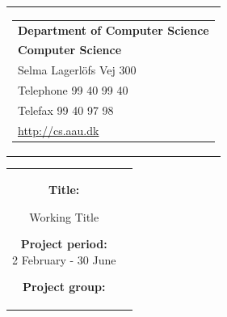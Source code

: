 \thispagestyle{empty}
\begin{titlepage}
\begin{nopagebreak}
{\samepage 
\begin{tabular}{r}
\parbox{\textwidth}{  
\hfill \parbox{5.9cm}{\begin{tabular}{l}
{\sf\small \textbf{Department of Computer Science}}\\
{\sf\small  \textbf{Computer Science}} \\
{\sf\small Selma Lagerl\"{o}fs Vej 300} \\
{\sf\small Telephone 99 40 99 40} \\
{\sf\small Telefax 99 40 97 98} \\
{\sf\small \url{http://cs.aau.dk}}
\end{tabular}}}
\\
\end{tabular}

\begin{tabular}{cc}
\parbox{7cm}{
\begin{description}

\item {\bf Title:} 

Working Title

\end{description}

\parbox{8cm}{

\begin{description}
\item {\bf Project period:}\\
   2 February - 30 June \\
  \hspace{3cm}
\item {\bf Project group:}\\
  

\end{description}}}
\end{tabular}}
\end{nopagebreak}
\end{titlepage}
